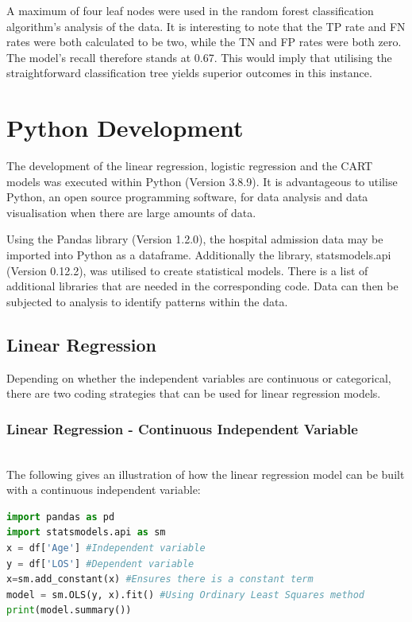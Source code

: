 \documentclass[../thesis.tex]{subfiles}
\begin{document}
A maximum of four leaf nodes were used in the random forest classification algorithm's analysis of the data. It is interesting to note that the TP rate and FN rates were both calculated to be two, while the TN and FP rates were both zero. The model's recall therefore stands at 0.67. This would imply that utilising the straightforward classification tree yields superior outcomes in this instance.


\section{Python Development}\label{sec:python}
The development of the linear regression, logistic regression and the CART models was executed within Python (Version 3.8.9). It is advantageous to utilise Python, an open source programming software, for data analysis and data visualisation when there are large amounts of data.

Using the Pandas library \cite{McKinney2010} (Version 1.2.0), the hospital admission data may be imported into Python as a dataframe. Additionally the library, statsmodels.api \cite{Perktold2022} (Version 0.12.2), was utilised to create statistical models. There is a list of additional libraries that are needed in the corresponding code. Data can then be subjected to analysis to identify patterns within the data.

\subsection{Linear Regression}
Depending on whether the independent variables are continuous or categorical, there are two coding strategies that can be used for linear regression models.

\subsubsection{Linear Regression - Continuous Independent Variable}\\
The following gives an illustration of how the linear regression model can be built with a continuous independent variable:
\begin{lstlisting}[language = python]
import pandas as pd
import statsmodels.api as sm
x = df['Age'] #Independent variable
y = df['LOS'] #Dependent variable
x=sm.add_constant(x) #Ensures there is a constant term
model = sm.OLS(y, x).fit() #Using Ordinary Least Squares method
print(model.summary())
\end{lstlisting}
\end{document}
